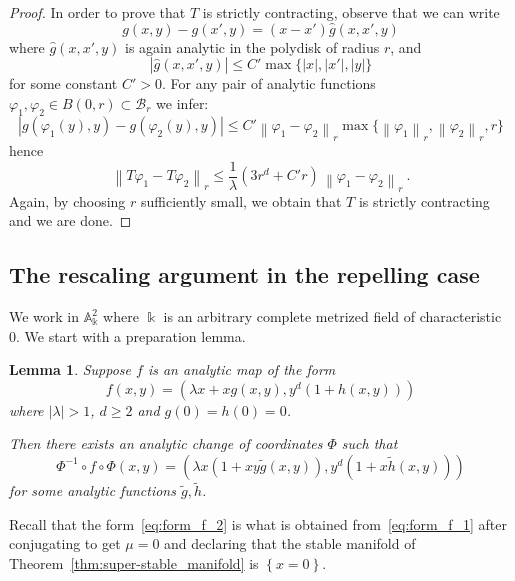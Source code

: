 \documentclass[11 pt, oneside, a4paper]{amsart}
\newcommand{\norm}[1]{\left\|#1\right\|}
\newcommand{\abs}[1]{{\left|{#1}\right|}}
\newcommand{\set}[1]{{\left\{#1\right\}}}
\newcommand{\nk}{\Bbbk}
\newtheorem{lem}[thm]{Lemma}
\theoremstyle{definition}
\theoremstyle{definition}
\begin{document}
\begin{proof}
In order to prove that $T$ is strictly contracting, observe that
we can write  
\[
g(x,y) - g(x',y) = (x-x') \hat{g}(x,x',y)
\]
where $\hat{g}(x,x',y)$ is again analytic in the polydisk of radius $r$, and
\[
| \hat{g}(x,x',y)| \le C' \max \{|x|, |x'|, |y|\}
\]
for some constant $C'>0$.
For any pair of  analytic functions $\varphi_1, \varphi_2 \in B(0,r)\subset \mathcal{B}_r$ we infer:
\[
|g(\varphi_1(y),y) - g(\varphi_2(y),y)|
\le 
C' \norm{\varphi_1 - \varphi_2}_r \max \{\norm{\varphi_1}_r, \norm{\varphi_2}_r ,r \}
\]
hence
\[
\norm{T\varphi_1- T\varphi_2}_r
\le 
\frac1{\lambda}
(3r^d + C' r )\, \norm{\varphi_1 - \varphi_2}_r ~.
\]
Again, by choosing $r$ sufficiently small, 
we obtain  that $T$ is strictly contracting and we are done.
\end{proof}

    
\subsection{The rescaling argument in the repelling case}
We work in $\mathbb{A}^2_\nk$ where $\nk$ is an arbitrary complete  metrized field of characteristic 0. 
We start with a preparation lemma. 
\begin{lem}\label{lem:preparation_saddle}
Suppose $f$ is an analytic map of the form 
\begin{equation}\label{eq:form_f_2}
f(x,y) =  \left(\lambda x + x g(x,y) , y^d(1+ h(x,y))\right)
\end{equation}
where $\abs{\lambda} >1$, 
$d\ge 2$ and $g(0)=h(0)=0$. 

Then there exists an analytic  change of coordinates $\Phi$ such that
\[
\Phi^{-1} \circ f \circ \Phi (x,y)=
 (\lambda x (1 + xy \tilde{g}(x,y)) , y^d(1+x \tilde{h}(x,y)))
\]
for some analytic functions $\tilde{g},\tilde{h}$.
\end{lem}

Recall that the form~\eqref{eq:form_f_2} is what is obtained from~\eqref{eq:form_f_1} after conjugating to get $\mu = 0$ and 
declaring that the stable manifold of Theorem~\ref{thm:super-stable_manifold} is $\set{x=0}$. 
  
\end{document}
